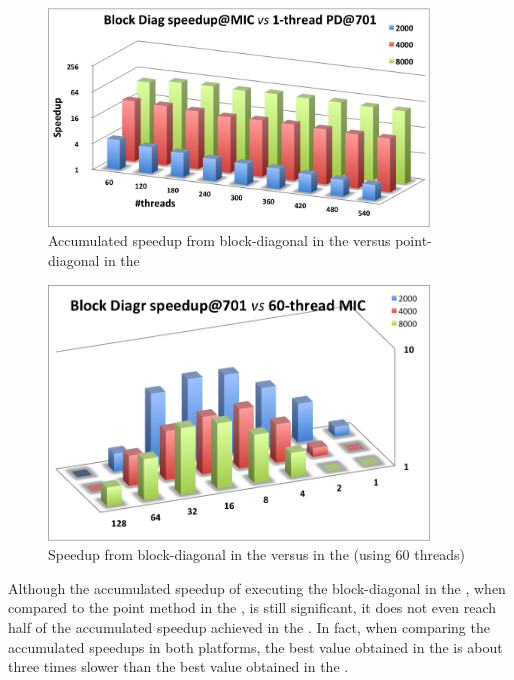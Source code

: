 \documentclass[../thesis]{subfiles}
\begin{document}
	\begin{figure}[htp]
		\begin{center}
			\includegraphics[width=0.9\textwidth]{assets/images/mic/mic-cpu-speedup-accumulated.png}
		\end{center}
		\caption{Accumulated speedup from block-diagonal in the \intel\xeonphi versus point-diagonal in the \cpu}
		\label{fig:mic:mic-cpu:speedup:accumulated}
	\end{figure}

	\begin{figure}[htp]
		\begin{center}
			\includegraphics[width=0.9\textwidth]{assets/images/mic/cpu-mic-speedup.png}
		\end{center}
		\caption{Speedup from block-diagonal in the \cpu versus in the \intel\xeonphi (using 60 threads)}
		\label{fig:mic:cpu-mic:speedup}
	\end{figure}

	Although the accumulated speedup of executing the block-diagonal in the \intel\xeonphi, when compared to the point method in the \cpu, is still significant, it does not even reach half of the accumulated speedup achieved in the \cpu. In fact, when comparing the accumulated speedups in both platforms, the best value obtained in the \intel\xeonphi is about three times slower than the best value obtained in the \cpu.
\end{document}
